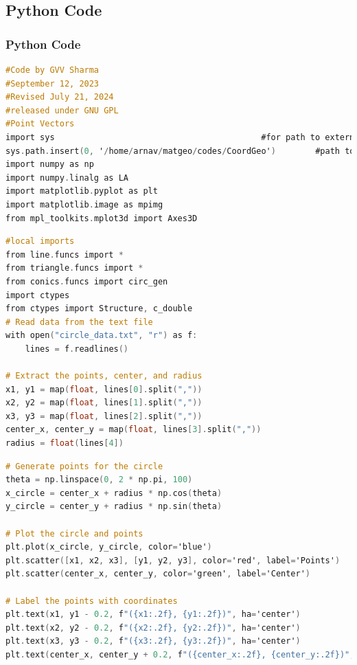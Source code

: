 \documentclass{beamer}
\theoremstyle{remark}
\numberwithin{equation}{section}
\begin{document}
\subsection{Python Code}
\begin{frame}[fragile]
\frametitle{Python Code}
\begin{lstlisting}[language=C]
#Code by GVV Sharma
#September 12, 2023
#Revised July 21, 2024
#released under GNU GPL
#Point Vectors
import sys                                          #for path to external scripts
sys.path.insert(0, '/home/arnav/matgeo/codes/CoordGeo')        #path to my scripts
import numpy as np
import numpy.linalg as LA
import matplotlib.pyplot as plt
import matplotlib.image as mpimg
from mpl_toolkits.mplot3d import Axes3D
\end{lstlisting}
\end{frame}
\begin{frame}[fragile]
\begin{lstlisting}[language=C]
#local imports
from line.funcs import *
from triangle.funcs import *
from conics.funcs import circ_gen
import ctypes
from ctypes import Structure, c_double
# Read data from the text file
with open("circle_data.txt", "r") as f:
    lines = f.readlines()

# Extract the points, center, and radius
x1, y1 = map(float, lines[0].split(","))
x2, y2 = map(float, lines[1].split(","))
x3, y3 = map(float, lines[2].split(","))
center_x, center_y = map(float, lines[3].split(","))
radius = float(lines[4])
\end{lstlisting}
\end{frame}
\begin{frame}[fragile]
\begin{lstlisting}[language=C]
# Generate points for the circle
theta = np.linspace(0, 2 * np.pi, 100)
x_circle = center_x + radius * np.cos(theta)
y_circle = center_y + radius * np.sin(theta)

# Plot the circle and points
plt.plot(x_circle, y_circle, color='blue')
plt.scatter([x1, x2, x3], [y1, y2, y3], color='red', label='Points')
plt.scatter(center_x, center_y, color='green', label='Center')

# Label the points with coordinates
plt.text(x1, y1 - 0.2, f"({x1:.2f}, {y1:.2f})", ha='center')
plt.text(x2, y2 - 0.2, f"({x2:.2f}, {y2:.2f})", ha='center')
plt.text(x3, y3 - 0.2, f"({x3:.2f}, {y3:.2f})", ha='center')
plt.text(center_x, center_y + 0.2, f"({center_x:.2f}, {center_y:.2f})", ha='center')
\end{lstlisting}
\end{frame}
\end{document}
